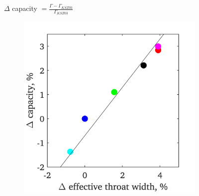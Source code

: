 \documentclass[a4paper, 11pt, oneside]{report}
\begin{document}
\begin{figure}[H]
	\centering
	$\Delta$ capacity $= \frac{\Gamma - \Gamma_{KSZ03}}{\Gamma_{KSZ03}}$
	\hspace{0.45cm}
	\begin{subfigure}{.45\textwidth}
		\centering
		\includegraphics[width=\linewidth]{figs/t900_2d_capacities_vs_effective_throat_widths.png}
	\end{subfigure}
	\begin{subfigure}{.1125\textwidth}
		\centering

\end{subfigure}
\end{figure}
\end{document}
